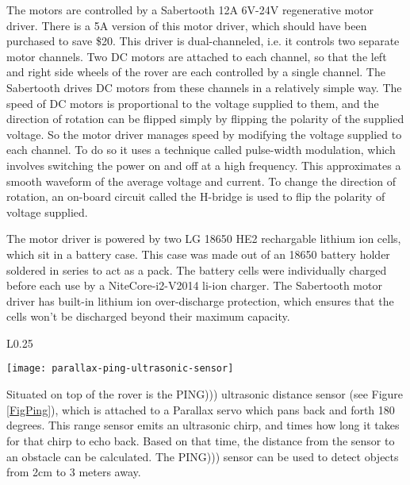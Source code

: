 The motors are controlled by a Sabertooth 12A 6V-24V regenerative motor driver. There is a 5A version of this motor driver, which should have been purchased to save \$20. This driver is dual-channeled, i.e. it controls two separate motor channels. Two DC motors are attached to each channel, so that the left and right side wheels of the rover are each controlled by a single channel. The Sabertooth drives DC motors from these channels in a relatively simple way. The speed of DC motors is proportional to the voltage supplied to them, and the direction of rotation can be flipped simply by flipping the polarity of the supplied voltage. So the motor driver manages speed by modifying the voltage supplied to each channel. To do so it uses a technique called pulse-width modulation, which involves switching the power on and off at a high frequency. This approximates a smooth waveform of the average voltage and current. To change the direction of rotation, an on-board circuit called the H-bridge is used to flip the polarity of voltage supplied. \cite{dcMotorBlog}


The motor driver is powered by two LG 18650 HE2 rechargable lithium ion cells, which sit in a battery case. This case was made out of an 18650 battery holder soldered in series to act as a pack. The battery cells were individually charged before each use by a NiteCore-i2-V2014 li-ion charger. The Sabertooth motor driver has built-in lithium ion over-discharge protection, which ensures that the cells won't be discharged beyond their maximum capacity.

\begin{wrapfigure}{L}{0.25\textwidth} %
	\caption{\cite{fig_ping}}
	\centering
	\texttt{[image: parallax-ping-ultrasonic-sensor]}
	\label{FigPing}
\end{wrapfigure}

Situated on top of the rover is the PING))) ultrasonic distance sensor (see Figure \ref{FigPing}), which is attached to a Parallax servo which pans back and forth 180 degrees. This range sensor emits an ultrasonic chirp, and times how long it takes for that chirp to echo back. Based on that time, the distance from the sensor to an obstacle can be calculated. The PING))) sensor can be used to detect objects from 2cm to 3 meters away. \cite{pingDocumentation}


